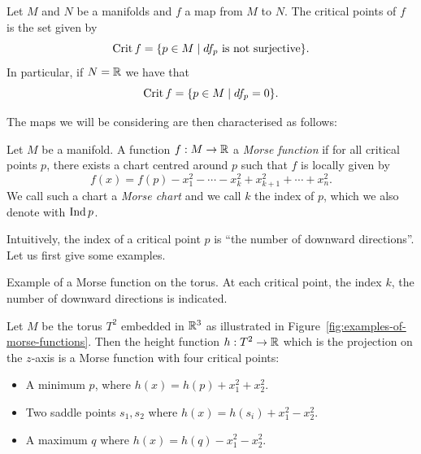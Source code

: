 \begin{definition}
    Let $M$ and $N$ be a manifolds and  $f$ a map from $M$ to $N$.
    The critical points of $f$ is the set given by
    \[
    \operatorname{Crit} f = \{p \in M  \mid \text{$df_p$ is not surjective}\} 
    .\] 
    In particular, if $N = \mathbb{R}$ we have that
    \[
    \operatorname{Crit} f = \{ p \in M  \mid  df_p = 0\} 
    .\] 
\end{definition}
The maps we will be considering are then characterised as follows:
\begin{definition}
    Let $M$ be a manifold. A function $f: M \to  \mathbb{R}$ a \emph{Morse function} if for all critical points $p$, there exists a chart centred around $p$ such that $f$ is locally given by
    \[
        f(x) = f(p) -x_1^2 - \cdots - x_k^2 + x_{k+1}^2 + \cdots + x_n^2
    .\] 
    We call such a chart a \emph{Morse chart} and we call $k$ the index of $p$, which we also denote with $\operatorname{Ind} p$.
    
\end{definition}
Intuitively, the index of a critical point $p$ is ``the number of downward directions''.
Let us first give some examples.
\begin{marginfigure}
    \centering
    \caption{Example of a Morse function on the torus. At each critical point, the index $k$, the number of downward directions is indicated. }
    \label{fig:examples-of-morse-functions}
\end{marginfigure}
\begin{eg}
    Let $M$ be the torus  $T^2$ embedded in $\mathbb{R}^3$ as illustrated in Figure~\ref{fig:examples-of-morse-functions}.
    Then the height function $h: T^2 \to  \mathbb{R}$ which is the projection on the $z$-axis is a Morse function with four critical points:
    \begin{itemize}
        \item A minimum $p$, where $h(x) = h(p) + x_1^2 + x_2^2$.
        \item Two saddle points $s_1, s_2$ where $h(x) = h(s_i) + x_1^2 - x_2^2$.
        \item A maximum $q$ where $h(x) = h(q) - x_1^2 - x_2^2$.
    \end{itemize}
\end{eg}

